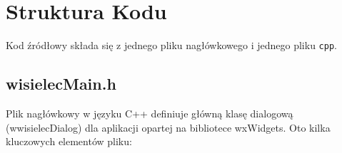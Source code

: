 \documentclass[]{report}
\begin{document}
\newpage
\section *{Struktura Kodu}
Kod źródłowy składa się z jednego pliku nagłówkowego i jednego pliku  \texttt{cpp}. 

\subsection*{wisielecMain.h}

Plik nagłówkowy w języku C++ definiuje główną klasę dialogową (wwisielecDialog) dla aplikacji opartej na bibliotece wxWidgets. Oto kilka kluczowych elementów pliku:
	
\end{document}
